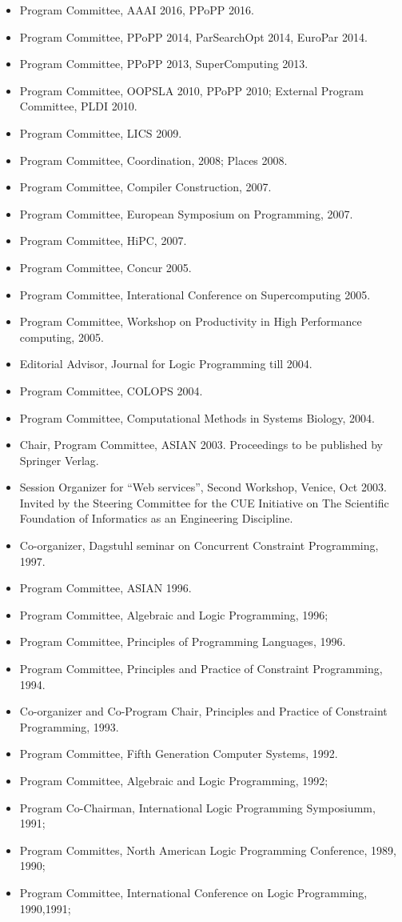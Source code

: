 \documentclass{article}
\begin{document}
\begin{itemize}
\item Program Committee, AAAI 2016, PPoPP 2016.
\item Program Committee, PPoPP 2014, ParSearchOpt 2014, EuroPar 2014.
\item Program Committee, PPoPP 2013, SuperComputing 2013.
\item Program Committee, OOPSLA 2010, PPoPP 2010; External Program
  Committee, PLDI 2010.
\item Program Committee, LICS 2009.
\item Program Committee, Coordination, 2008; Places 2008.
\item Program Committee, Compiler Construction, 2007.
\item Program Committee, European Symposium on Programming, 2007.
\item Program Committee, HiPC, 2007.
\item Program Committee, Concur 2005.
\item Program Committee, Interational Conference on Supercomputing 2005.
 \item Program Committee, Workshop on Productivity in High Performance computing, 2005.
\item Editorial Advisor, Journal for Logic Programming till 2004.
 \item Program Committee, COLOPS 2004.
 \item Program Committee, Computational Methods in Systems Biology, 2004.
 \item Chair, Program Committee, ASIAN 2003. Proceedings to be
   published by Springer Verlag.
 \item Session Organizer for ``Web services'', Second Workshop,
   Venice, Oct 2003. Invited by the Steering Committee for the CUE
   Initiative on The Scientific Foundation of Informatics as an
   Engineering Discipline.
 \item Co-organizer, Dagstuhl seminar on Concurrent Constraint
   Programming, 1997.
 \item Program Committee, ASIAN 1996.
 \item Program Committee, Algebraic and Logic Programming, 1996; 
 \item Program Committee, Principles of Programming Languages,  1996.
 \item Program Committee, Principles and Practice of Constraint
   Programming, 1994.
 \item Co-organizer and Co-Program Chair, Principles and Practice of
   Constraint Programming, 1993.
 \item Program Committee, Fifth Generation Computer Systems, 1992.
 \item Program Committee, Algebraic and Logic Programming,  1992; 
 \item Program Co-Chairman, International  Logic Programming Symposiumm, 1991;
 \item Program Committes, North American Logic Programming
   Conference, 1989, 1990;
 \item Program Committee, International Conference on Logic
   Programming, 1990,1991;
\end{itemize}
\end{document}
